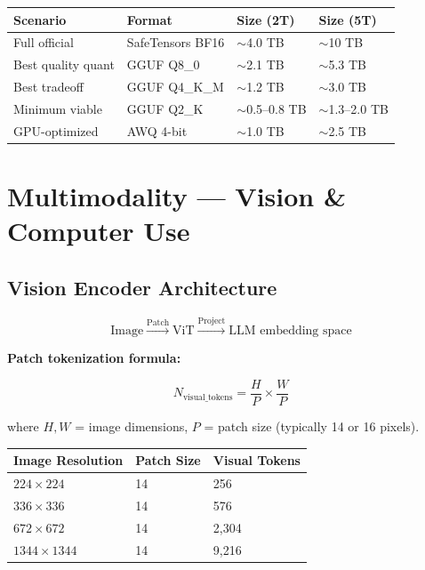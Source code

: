 \documentclass[11pt,a4paper]{article}
\begin{document}
\begin{center}
\begin{tabular}{llll}
\toprule
\textbf{Scenario} & \textbf{Format} & \textbf{Size (2T)} & \textbf{Size (5T)} \\
\midrule
Full official & SafeTensors BF16 & $\sim$4.0 TB & $\sim$10 TB \\
Best quality quant & GGUF Q8\_0 & $\sim$2.1 TB & $\sim$5.3 TB \\
Best tradeoff & GGUF Q4\_K\_M & $\sim$1.2 TB & $\sim$3.0 TB \\
Minimum viable & GGUF Q2\_K & $\sim$0.5--0.8 TB & $\sim$1.3--2.0 TB \\
GPU-optimized & AWQ 4-bit & $\sim$1.0 TB & $\sim$2.5 TB \\
\bottomrule
\end{tabular}
\end{center}

\section{Multimodality --- Vision \& Computer Use}

\subsection{Vision Encoder Architecture}

$$\text{Image} \xrightarrow{\text{Patch}} \text{ViT} \xrightarrow{\text{Project}} \text{LLM embedding space}$$

\textbf{Patch tokenization formula:}

$$N_{\text{visual\_tokens}} = \frac{H}{P} \times \frac{W}{P}$$

where $H, W$ = image dimensions, $P$ = patch size (typically 14 or 16 pixels).

\begin{center}
\begin{tabular}{lll}
\toprule
\textbf{Image Resolution} & \textbf{Patch Size} & \textbf{Visual Tokens} \\
\midrule
$224 \times 224$ & 14 & 256 \\
$336 \times 336$ & 14 & 576 \\
$672 \times 672$ & 14 & 2,304 \\
$1344 \times 1344$ & 14 & 9,216 \\
\bottomrule
\end{tabular}
\end{center}
\end{document}
